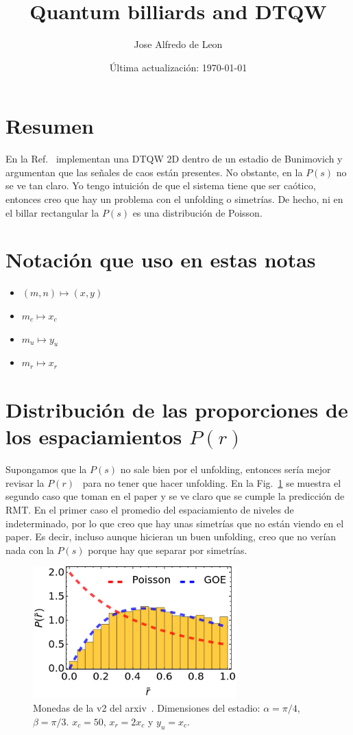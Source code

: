 \documentclass[10pt,letterpaper]{article} %
\title{Quantum billiards and DTQW}
\author{Jose Alfredo de Leon}
\date{Última actualización: \today}
\begin{document}
\maketitle

\section{Resumen}
En la Ref.~\cite{alonso-lobo_2025_simplest} implementan una DTQW 2D dentro 
de un estadio de Bunimovich y argumentan que las señales de caos están presentes. 
No obstante, en la $P(s)$ no se ve tan claro. Yo tengo intuición de que el sistema 
tiene que ser caótico, entonces creo que hay un problema con el unfolding 
o simetrías. De hecho, ni en el billar rectangular la $P(s)$ es una distribución 
de Poisson.

\section*{Notación que uso en estas notas}
\begin{itemize}
\item $(m,n) \longmapsto (x,y)$
\item $m_c \longmapsto x_c$
\item $m_u \longmapsto y_u$
\item $m_r \longmapsto x_r$
\end{itemize}

\section{Distribución de las proporciones de los espaciamientos $P(r)$}
Supongamos que la $P(s)$ no sale bien por el unfolding, entonces sería mejor 
revisar la $P(r)$~\cite{atas_2013_distribution} para no tener que hacer unfolding.  
En la Fig.~\ref{fig:1} se muestra el segundo caso que toman en el paper y se ve 
claro que se cumple la predicción de RMT. En el primer caso el  promedio 
del espaciamiento de niveles de indeterminado, por lo que creo que hay
unas simetrías que no están viendo en el paper. Es decir, incluso aunque hicieran 
un buen unfolding, creo que no verían nada con la $P(s)$ porque hay que separar
por simetrías.

\begin{figure}
\centering
\includegraphics[width=0.7\textwidth]{Uv2_xc_50_alpha_Pi-4_beta_Pi-3.png}
\caption{Monedas de la v2 del arxiv~\cite{alonso-lobo_2025_simplest}. 
Dimensiones del estadio:
$\alpha=\pi / 4$, $\beta=\pi / 3$. $x_c = 50$, $x_r=2 x_c$ y $y_u = x_c$.}
\label{fig:1}
\end{figure}



\end{document}
